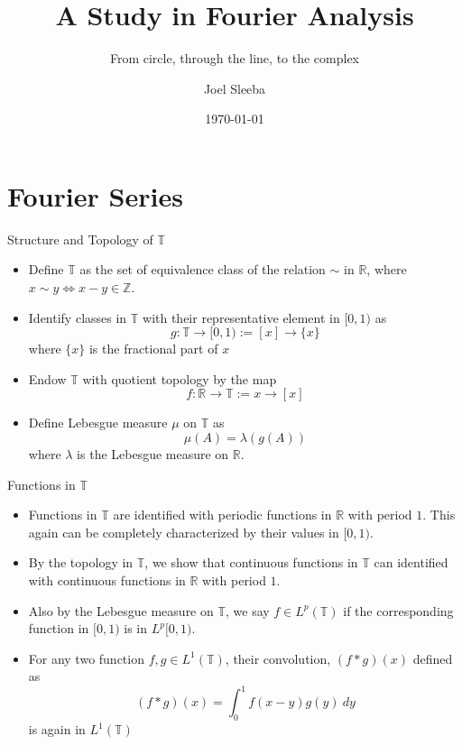 \documentclass[compress]{beamer}
\title{A Study in Fourier Analysis}
\subtitle{From circle, through the line, to the complex}
\author[author1]{Joel Sleeba}
\institute{IISER Thiruvananthapuram}
\date{\today}
\newcommand{\R}{\mathbb R}
\newcommand{\T}{\mathbb T}
\begin{document}
\begin{frame}
  \maketitle
\end{frame}


\section{Fourier Series}

\begin{frame}{Structure and Topology of $\mathbb{T}$}{}
  \begin{itemize}
    \item Define $\mathbb{T}$ as the set of equivalence class of the relation $\sim$ in $\R$, where $x\sim y \iff x-y \in \mathbb{Z}$. 
    \pause
  \item Identify classes in $\mathbb{T}$ with their representative element in $[0, 1)$ as
      \begin{equation}
        g: \T \to [0, 1) := [x] \to \{x\} 
        \label{eqn:identify_T_with_I}
      \end{equation}
    where $\{x\}$ is the fractional part of $x$
    \pause
    \item Endow $\mathbb{T}$ with quotient topology by the map 
      \begin{equation}
        f: \mathbb{R} \to \mathbb{T}:= x \to [x]
        \label{eqn:Topology_on_T}
      \end{equation}
    \pause
    \item Define Lebesgue measure $\mu$ on $\mathbb{T}$ as
      \begin{equation}
        \mu(A) = \lambda(g(A))
        \label{eq:measure_on_T}
      \end{equation}
      where $\lambda$ is the Lebesgue measure on $\R$.
  \end{itemize}
\end{frame}

\begin{frame}{Functions in $\T$}
  \begin{itemize}
    \item Functions in $\T$ are identified with periodic functions in $\R$ with period $1$. This again can be completely characterized by their values in $[0,1)$.
    \pause
    \item By the topology in $\T$, we show that continuous functions in $\T$ can identified with continuous functions in $\R$ with period $1$.
    \pause
    \item Also by the Lebesgue measure on $\T$, we say $f \in L^p(\T)$ if the corresponding function in $[0, 1)$ is in $L^p[0, 1)$.
    \pause
    \item For any two function $f, g \in L^1(\T)$, their convolution, $(f*g)(x)$ defined as
      \begin{equation}
        (f*g)(x) = \int_0^1 f(x-y)g(y) \ dy
        \label{eq:convolution_on_T}
      \end{equation}
    is again in $L^1(\T)$
  \end{itemize}
\end{frame}
\end{document}
